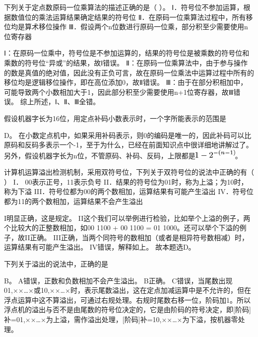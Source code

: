 \question 下列关于定点数原码一位乘算法的描述正确的是（ ）。
Ⅰ．符号位不参加运算，根据数值位的乘法运算结果确定结果的符号位
Ⅱ．在原码一位乘算法过程中，所有移位均是算术移位操作
Ⅲ．假设两个n位数进行原码一位乘，部分积至少需要使用n位寄存器
\par{}
\begin{solution}Ⅰ：在原码一位乘中，符号位是不参加运算的，结果的符号位是被乘数的符号位和乘数的符号位``异或''的结果，故Ⅰ错误。
Ⅱ：在原码一位乘算法中，由于参与操作的数是真值的绝对值，因此没有正负可言，故在原码一位乘法中运算过程中所有的移位均是逻辑移位操作，即在高位添加0，故Ⅱ错误。
Ⅲ：由于在部分积相加中，可能导致两个小数相加大于1，因此部分积至少需要使用n+1位寄存器，故Ⅲ错误。
综上所述，Ⅰ、Ⅱ、Ⅲ全错。
\end{solution}
\question 假设机器字长为16位，用定点补码小数表示时，一个字所能表示的范围是
\par\fourch{}{}{}{\textcolor{red}{}}
\begin{solution}D。
在小数定点机中，如果采用补码表示，则0的编码是唯一的，因此补码可以比原码和反码多表示一个-1，至于为什么，已经在前面知识点中很详细地讲解过了。另外，假设机器字长为n位，不管原码、补码、反码，上限都是\includegraphics[width=0.83333in,height=0.17708in]{texmath/8dff4c5Cdpi7B3507D1-7B25E7B-28n-1297D7D}。
\end{solution}
\question 计算机运算溢出检测机制，采用双符号位，下列关于双符号位的说法中正确的有（
） I． 00表示正号，11表示负号
II．结果的符号位为01时，称为上溢；为10时，称为下溢
III．符号位都为00的两个数相加，运算结果有可能产生溢出
IV．符号位都为11的两个数相加，运算结果不会产生溢出
\par{}
\begin{solution}I明显正确，这是规定。
II这个我们可以举例进行检验，比如举个上溢的例子，两个比较大的正整数相加，如00
1100 + 00 1100 = 01 1000。还可以举个下溢的例子，故II正确。
III正确，当两个同符号的数相加（或者是相异符号数相减）时，运算结果有可能产生溢出。
IV错误，解释如上。 故本题选D。
\end{solution}
\question 下列关于溢出的说法中，正确的是
\par{}
\begin{solution}B。 A错误，正数和负数相加不会产生溢出。 B正确。
C错误，当尾数出现01,××\ldots{}×或10,××\ldots{}×时，表示尾数溢出，这在定点加减运算中是不允许的，但在浮点运算中这不算溢出，可通过右规处理。右规时尾数右移一位，阶码加1。所以浮点机的溢出与否不是由尾数的符号位决定的，它是由阶码的符号决定，即{[}阶码{]}补=01,××\ldots{}×为上溢，需作溢出处理，{[}阶码{]}补=10,××\ldots{}×为下溢，按机器零处理。
\end{solution}
